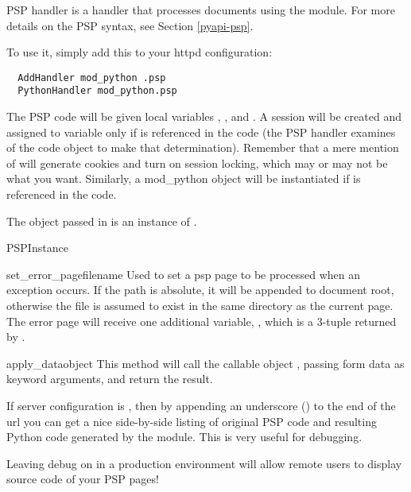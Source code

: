 PSP handler is a handler that processes documents using the
 module. For more details on the PSP syntax, see
Section \ref{pyapi-psp}.

To use it, simply add this to your httpd configuration: 

\begin{verbatim}
  AddHandler mod_python .psp
  PythonHandler mod_python.psp
\end{verbatim}

The PSP code will be given local variables , ,
 and . A session will be created and assigned
to  variable only if  is referenced in the
code (the PSP handler examines  of the code object to
make that determination). Remember that a mere mention of
 will generate cookies and turn on session locking,
which may or may not be what you want. Similarly, a mod_python
 object will be instantiated if  is
referenced in the code.

The object passed in  is an instance of .

\begin{classdesc}{PSPInstance}{}
  \begin{methoddesc}[PSPInstance]{set_error_page}{filename}
    Used to set a psp page to be processed when an exception
    occurs. If the path is absolute, it will be appended to document
    root, otherwise the file is assumed to exist in the same directory
    as the current page. The error page will receive one additional
    variable, , which is a 3-tuple returned by
    .
  \end{methoddesc}

  \begin{methoddesc}[PSPInstance]{apply_data}{object}
    This method will call the callable object , passing form
    data as keyword arguments, and return the result.
  \end{methoddesc}
\end{classdesc}

If  server configuration is , then by
appending an underscore (\samp{_}) to the end of the url you can get a
nice side-by-side listing of original PSP code and resulting Python
code generated by the  module. This is very useful for
debugging.

\begin{notice}
Leaving debug on in a production environment will allow remote users
to display source code of your PSP pages!
\end{notice}

